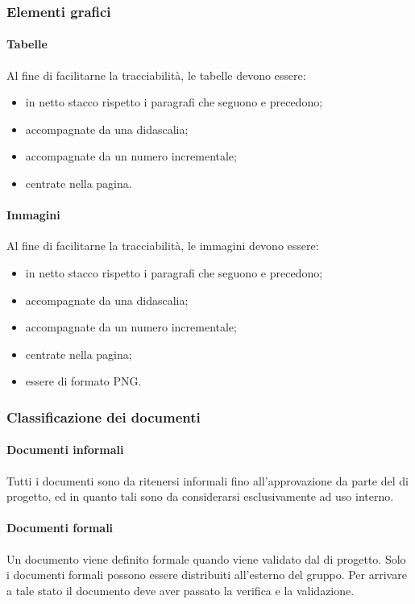 \subsubsection{Elementi grafici}
 \paragraph{Tabelle}
 Al fine di facilitarne la tracciabilità, le tabelle devono essere:
 \begin{itemize}
 	\item in netto stacco rispetto i paragrafi che seguono e precedono;
 	\item accompagnate da una didascalia;
 	\item accompagnate da un numero incrementale;
 	\item centrate nella pagina.
 \end{itemize}
 \paragraph{Immagini}

Al fine di facilitarne la tracciabilità, le immagini devono essere:
\begin{itemize}
	\item in netto stacco rispetto i paragrafi che seguono e precedono;
	\item accompagnate da una didascalia;
	\item accompagnate da un numero incrementale;
	\item centrate nella pagina;
	\item essere di formato PNG.
\end{itemize}
\subsubsection{Classificazione dei documenti}
 \paragraph{Documenti informali}
 Tutti i documenti sono da ritenersi informali fino all'approvazione da parte del \RESP{} di progetto, ed in quanto tali sono da considerarsi esclusivamente ad uso interno.
 \paragraph{Documenti formali}
 Un documento viene definito formale quando viene validato dal \RESP{} di progetto. Solo i documenti formali possono essere distribuiti all'esterno del gruppo. Per arrivare a tale stato il
documento deve aver passato la verifica e la validazione.
